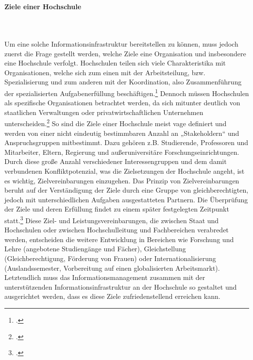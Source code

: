 \paragraph*{Ziele einer Hochschule}\mbox{}\\\\
Um eine solche Informationsinfrastruktur bereitstellen zu können, muss jedoch zuerst die Frage gestellt werden, welche Ziele eine Organisation und insbesondere eine Hochschule verfolgt.
Hochschulen teilen sich viele Charakteristika mit Organisationen, welche sich zum einen mit der Arbeitsteilung, bzw. Spezialisierung und zum anderen mit der Koordination, also  Zusammenführung der spezialisierten Aufgabenerfüllung beschäftigen.\footcite[Vgl.][]{grochla_organisationstheorie_1978} Dennoch müssen Hochschulen als spezifische Organisationen betrachtet werden, da sich mitunter deutlich von staatlichen Verwaltungen oder privatwirtschaftlichen Unternehmen unterscheiden.\footcite[Vgl.][]{muller_boling_betriebswirtschaft_1999}
So sind die Ziele einer Hochschule meist vage definiert und werden von einer nicht eindeutig bestimmbaren Anzahl an „Stakeholdern“ und Anspruchsgruppen mitbestimmt. Dazu gehören z.B. Studierende, Professoren und Mitarbeiter, Eltern, Regierung und außeruniversitäre Forschungseinrichtungen.
Durch diese große Anzahl verschiedener Interessengruppen und dem damit verbundenen Konfliktpotenzial, was die Zielsetzungen der Hochschule angeht, ist es wichtig, Zielvereinbarungen einzugehen. Das Prinzip von Zielvereinbarungen beruht auf der Verständigung der Ziele durch eine Gruppe von gleichberechtigten, jedoch mit unterschiedlichen Aufgaben ausgestatteten Partnern. Die Überprüfung der Ziele und deren Erfüllung findet zu einem später festgelegten Zeitpunkt statt.\footcite[Vgl.][]{FredowitzKrasnyZiegele_zielvereinbarungen_1999}
Diese Ziel- und Leistungsvereinbarungen, die zwischen Staat und Hochschulen oder zwischen Hochschulleitung und Fachbereichen verabredet werden, entscheiden die weitere Entwicklung in Bereichen wie Forschung und Lehre (angebotene Studiengänge und Fächer), Gleichstellung (Gleichberechtigung, Förderung von Frauen) oder Internationalisierung (Auslandssemester, Vorbereitung auf einen globalisierten Arbeitsmarkt).
Letztendlich muss das Informationsmanagement zusammen mit der unterstützenden Informationsinfrastruktur an der Hochschule so gestaltet und ausgerichtet werden, dass es diese Ziele zufriedenstellend erreichen kann. 
